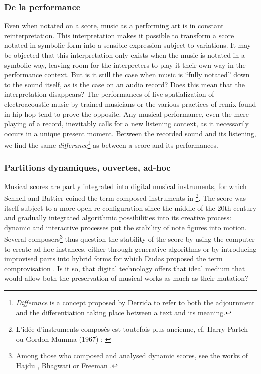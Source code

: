 \subsubsection{De la performance}
\noindent Even when notated on a score, music as a performing art is in constant reinterpretation. This interpretation makes it possible to transform a score notated in symbolic form into a sensible expression subject to variations. It may be objected that this interpretation only exists when the music is notated in a symbolic way, leaving room for the interpreters to play it their own way in the performance context. But is it still the case when music is “fully notated” down to the sound itself, as is the case on an audio record? Does this mean that the interpretation disappears? The performances of live spatialization of electroacoustic music by trained musicians or the various practices of remix found in hip-hop tend to prove the opposite. Any musical performance, even the mere playing of a record, inevitably calls for a new listening context, as it necessarily occurs in a unique present moment. Between the recorded sound and its listening, we find the same \textit{differance}\footnote{\textit{Differance} is a concept proposed by Derrida \cite{derrida_lecriture_2014} to refer to both the adjournment and the differentiation taking place between a text and its meaning.} as between a score and its performances.

\subsubsection{Partitions dynamiques, ouvertes, ad-hoc}
\noindent  Musical scores are partly integrated into digital musical instruments, for which Schnell and Battier coined the term composed instruments in \cite{schnell_introducing_2002}\footnote{L'idée d'instruments composés est toutefois plus ancienne, cf. Harry Partch ou Gordon Mumma (1967) : \cite{mumma_creative_1967}}. The score was itself subject to a more open re-configuration since the middle of the 20th century and gradually integrated algorithmic possibilities into its creative process: dynamic and interactive processes put the stability of note figures into motion. Several composers\footnote{ Among those who composed and analysed dynamic scores, see the works of Hajdu \cite{hajdu_disposable_2016}, Bhagwati \cite{bhagwati_vexations_2017} or Freeman \cite{freeman_extreme_2008}.} thus question the stability of the score by using the computer to create ad-hoc instances, either through generative algorithms or by introducing improvised parts into hybrid forms for which Dudas proposed the term comprovisation \cite{dudas_comprovisation:_2010}. Is it so, that digital technology offers that ideal medium that would allow both the preservation of musical works as much as their mutation?

